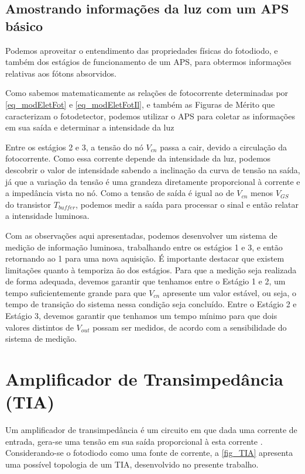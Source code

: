 \subsection{Amostrando informações da luz com um APS básico}
\label{secao_amostrando}

Podemos aproveitar o entendimento das propriedades f\'isicas do fotodiodo, e tamb\'em dos est\'agios de funcionamento de um APS, para obtermos informações relativas aos f\'otons absorvidos.

Como sabemos matematicamente as relações de fotocorrente determinadas por \autoref{eq_modEletFot} e \autoref{eq_modEletFotIl}, e tamb\'em as Figuras de M\'erito que caracterizam o fotodetector, podemos utilizar o APS para coletar as informações em sua sa\'ida e determinar a intensidade da luz

Entre os est\'agios 2 e 3, a tensão do n\'o $V_{cn}$ passa a cair, devido a circulação da fotocorrente. Como essa corrente depende da intensidade da luz, podemos descobrir o valor de intensidade sabendo a inclinação da curva de tensão na sa\'ida, j\'a que a variação da tensão \'e uma grandeza diretamente proporcional à corrente e a imped\^ancia vista no n\'o. Como a tensão de sa\'ida \'e igual ao de $V_{cn}$ menos $V_{GS}$ do transistor $T_{buffer}$, podemos medir a sa\'ida para processar o sinal e então relatar a intensidade luminosa.

Com as observações aqui apresentadas, podemos desenvolver um sistema de medição de informação luminosa, trabalhando entre os est\'agios 1 e 3, e então retornando ao 1 para uma nova aquisição. \'E importante destacar que existem limitações quanto \`a temporiza ão dos est\'agios. Para que a medição seja realizada de forma adequada, devemos garantir que tenhamos entre o Est\'agio 1 e 2, um tempo suficientemente grande para que $V_{cn}$ apresente um valor estável, ou seja, o tempo de transição do sistema nessa condição seja conclu\'ido. Entre o Est\'agio 2 e Est\'agio 3, devemos garantir que tenhamos um tempo mínimo para que dois valores distintos de $V_{out}$ possam ser medidos, de acordo com a sensibilidade do sistema de medição.

\section{Amplificador de Transimped\^ancia (TIA)}
\label{section:TIA}

Um amplificador de transimped\^ancia \'e um circuito em que dada uma corrente de entrada, gera-se uma tensão em sua sa\'ida proporcional \`a esta corrente \cite{RazaviFundM}. Considerando-se o fotodiodo como uma fonte de corrente, a \autoref{fig_TIA} apresenta uma poss\'ivel topologia de um TIA, desenvolvido no presente trabalho.

